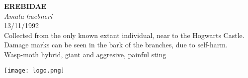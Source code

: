 \documentclass[
  landscape]{article}
\begin{document}
\begin{mdframed}[linecolor=mycolortext, linewidth=2pt, backgroundcolor=mycolor]

  \bigskip
  \begin{flushright}
  \begin{minipage}[t][-50ex][t]{16em}  
  \end{minipage}
  \end{flushright}
  \bigskip
  \begin{adjustwidth}{1cm}{1cm}
  {\fontsize{50pt}{0pt}\selectfont\bf\textcolor{mycolortext}{ EREBIDAE }} \\
  \linebreak
  \linebreak
  {\fontsize{40pt}{100pt}\selectfont\textcolor{mycolortext}{\emph{ Amata huebneri }}} \\
  \vfill
  {\fontsize{30pt}{100pt}\selectfont\textcolor{mycolortext}{ 13/11/1992 }} \\
  \vfill
  {\fontsize{30pt}{100pt}\selectfont\textcolor{mycolortext}{ Collected from the only known extant individual, near to the Hogwarts Castle. Damage marks can be seen in the bark of the branches, due to self-harm. }} \\
  \vfill
  {\fontsize{30pt}{50pt}\selectfont\textcolor{mycolortext}{ Wasp-moth hybrid, giant and aggresive, painful sting }} \\
  \end{adjustwidth}
  \begin{center}
  \texttt{[image: logo.png]}
  \end{center}
  \end{mdframed}
  \pagebreak

\end{document}
